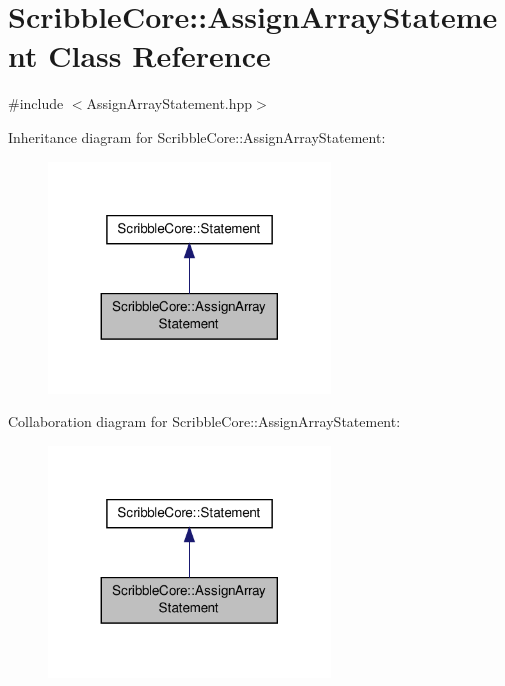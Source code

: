 \hypertarget{class_scribble_core_1_1_assign_array_statement}{\section{Scribble\-Core\-:\-:Assign\-Array\-Statement Class Reference}
\label{class_scribble_core_1_1_assign_array_statement}
}


{\ttfamily \#include $<$Assign\-Array\-Statement.\-hpp$>$}



Inheritance diagram for Scribble\-Core\-:\-:Assign\-Array\-Statement\-:\nopagebreak
\begin{figure}[H]
\begin{center}
\leavevmode
\includegraphics[width=212pt]{class_scribble_core_1_1_assign_array_statement__inherit__graph}
\end{center}
\end{figure}


Collaboration diagram for Scribble\-Core\-:\-:Assign\-Array\-Statement\-:\nopagebreak
\begin{figure}[H]
\begin{center}
\leavevmode
\includegraphics[width=212pt]{class_scribble_core_1_1_assign_array_statement__coll__graph}
\end{center}
\end{figure}
